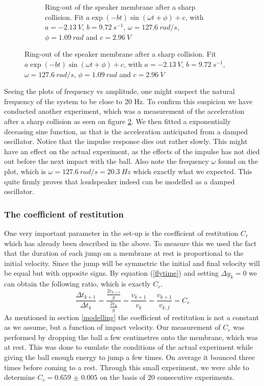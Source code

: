 \documentclass[12pt,oneside,a4paper]{article}
\numberwithin{equation}{section}
\begin{document}
{{{{\begin{figure}[h]
\begin{subfigure}[t]{0.49\textwidth}
		\caption{Ring-out of the speaker membrane after a sharp collision. Fit $a\exp(-bt)\sin(\omega t + \phi)+c$, with $a=\SI{-2.13}{V}$, $b=\SI{9.72}{s^{-1}}$, $\omega=\SI{127.6}{rad/s}$, $\phi=\SI{1.09}{rad}$ and $c=\SI{2.96}{V}$}
		\label{ringout}
	\end{subfigure}
\end{figure}
Seeing the plots of frequency vs amplitude, one might suspect the natural frequency of the system to be close to 20 Hz. To confirm this suspicion we have conducted another experiment, which was a measurement of the acceleration after a sharp collision as seen on figure \ref{ringout}. We then fitted a exponentially deceasing sine function, as that is the acceleration anticipated from a damped oscillator. Notice that the impulse response dies out rather slowly. This might have an effect on the actual experiment, as the effects of the impulse has not died out before the next impact with the ball. Also note the frequency $\omega$ found on the plot, which is $\omega = \SI{127.6}{rad/s} = \SI{20.3}{Hz}$ which exactly what we expected. This quite firmly proves that loudspeaker indeed can be modelled as a damped oscillator.
\subsubsection{The coefficient of restitution}
One very important parameter in the set-up is the coefficient of restitution 
$C_r$ which has already been described in the above. To measure this we used 
the fact that the duration of each jump on a membrane at rest is proportional 
to the initial velocity. Since the jump will be symmetric the initial and 
final velocity will be equal but with opposite signs. By equation 
(\ref{flytime}) and setting $\Delta y_k=0$ we can obtain the following ratio, 
which is exactly $C_r$.
\begin{equation}
	\frac{\Delta t_{k+1}}{\Delta t_{k}}= \frac{\frac{2v_{k+1}}{g}}{\frac{2v_{k}}{g}} = \frac{v_{k+1}}{v_k} = \frac{v_{k+1}}{v_{k,f}} = C_r
\end{equation}
As mentioned in section \ref{modelling} the coefficient of restitution is not a 
constant as we assume, but a function of impact velocity. Our measurement of 
$C_r$ was performed by dropping the ball a few centimetres onto the membrane, 
which was at rest. This was done to emulate the conditions of the actual 
experiment while giving the ball enough energy to jump a few times. On average 
it bounced three times before coming to a rest. Through this small experiment, 
we were able to determine $C_r= \num{0.659(5)}$ on the basis of 20 consecutive 
experiments. 
}}}}
\end{document}
